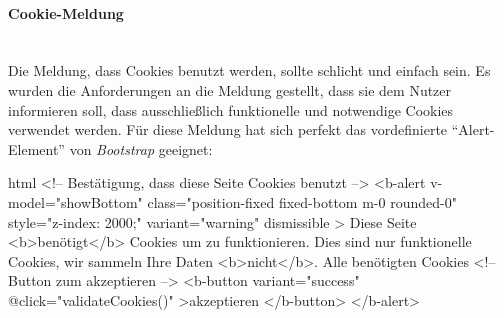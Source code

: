 \paragraph{Cookie-Meldung}
~\\
Die Meldung, dass Cookies benutzt werden, sollte schlicht und einfach sein. Es wurden die Anforderungen an die Meldung gestellt, dass sie dem Nutzer informieren soll, dass ausschließlich funktionelle und notwendige Cookies verwendet werden. Für diese Meldung hat sich perfekt das vordefinierte \enquote{Alert-Element} von \textit{Bootstrap} geeignet:
\makeatletter
\begin{code}{html}
	<!-- Bestätigung, dass diese Seite Cookies benutzt -->
	<b-alert
		v-model="showBottom"
		class="position-fixed fixed-bottom m-0 rounded-0"
		style="z-index: 2000;"
		variant="warning"
		dismissible
	>
		Diese Seite <b>benötigt</b> Cookies um zu funktionieren. Dies sind nur
		funktionelle Cookies, wir sammeln Ihre Daten <b>nicht</b>. Alle benötigten
		Cookies
		<!-- Button zum akzeptieren -->
		<b-button variant="success" @click="validateCookies()"
			>akzeptieren
		</b-button>
	</b-alert>
\end{code}
\makeatother
{}
	\label{list:cookiehtml} ~\\
\newpage
